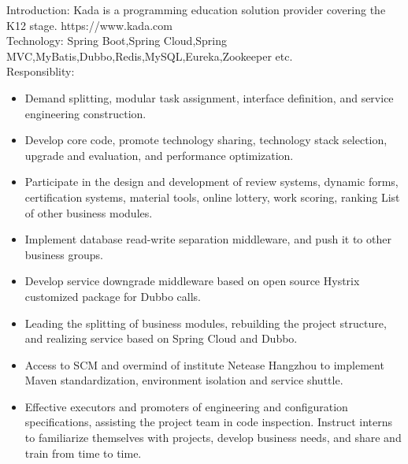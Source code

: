 \documentclass{resume}
\begin{document}
Introduction: Kada is a programming education solution provider covering the K12 stage. https://www.kada.com\\
Technology: Spring Boot,Spring Cloud,Spring MVC,MyBatis,Dubbo,Redis,MySQL,Eureka,Zookeeper etc.\\
Responsiblity:
\begin{itemize}
  \item Demand splitting, modular task assignment, interface definition, and service engineering construction.
  \item Develop core code, promote technology sharing, technology stack selection, upgrade and evaluation, and performance optimization.
  \item Participate in the design and development of review systems, dynamic forms, certification systems, material tools, online lottery, work scoring, ranking
List of other business modules.
  \item Implement database read-write separation middleware, and push it to other business groups.
  \item Develop service downgrade middleware based on open source Hystrix customized package for Dubbo calls.
  \item Leading the splitting of business modules, rebuilding the project structure, and realizing service based on Spring Cloud and Dubbo.
  \item Access to SCM and overmind of institute Netease Hangzhou to implement Maven standardization, environment isolation and service shuttle.
  \item Effective executors and promoters of engineering and configuration specifications, assisting the project team in code inspection. Instruct interns to familiarize themselves with projects, develop business needs, and share and train from time to time.
\end{itemize}
\end{document}
